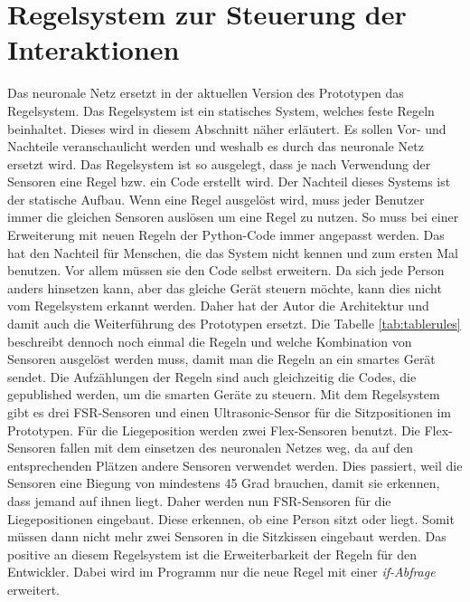 \section{Regelsystem zur Steuerung der Interaktionen} 
\label{sec:rules}
Das neuronale Netz ersetzt in der aktuellen Version des Prototypen das Regelsystem. Das Regelsystem ist ein statisches System, welches feste Regeln beinhaltet. Dieses wird in diesem Abschnitt näher erläutert. Es sollen Vor- und Nachteile veranschaulicht werden und weshalb es durch das neuronale Netz ersetzt wird.
\newline
Das Regelsystem ist so ausgelegt, dass je nach Verwendung der Sensoren eine Regel bzw. ein Code erstellt wird. Der Nachteil dieses Systems ist der statische Aufbau. Wenn eine Regel ausgelöst wird, muss jeder Benutzer immer die gleichen Sensoren auslösen um eine Regel zu nutzen. So muss bei einer Erweiterung mit neuen Regeln der Python-Code immer angepasst werden. Das hat den Nachteil für Menschen, die das System nicht kennen und zum ersten Mal benutzen. Vor allem müssen sie den Code selbst erweitern.
\newline
Da sich jede Person anders hinsetzen kann, aber das gleiche Gerät steuern möchte, kann dies nicht vom Regelsystem erkannt werden. Daher hat der Autor die Architektur und damit auch die Weiterführung des Prototypen ersetzt. Die Tabelle \ref{tab:tablerules} beschreibt dennoch noch einmal die Regeln und welche Kombination von Sensoren ausgelöst werden muss, damit man die Regeln an ein smartes Gerät sendet. Die Aufzählungen der Regeln sind auch gleichzeitig die Codes, die gepublished werden, um die smarten Geräte zu steuern. 
\newline
Mit dem Regelsystem gibt es drei FSR-Sensoren und einen Ultrasonic-Sensor für die Sitzpositionen im Prototypen. Für die Liegeposition werden zwei Flex-Sensoren benutzt. Die Flex-Sensoren fallen mit dem einsetzen des neuronalen Netzes weg, da auf den entsprechenden Plätzen andere Sensoren verwendet werden. Dies passiert, weil die Sensoren eine Biegung von mindestens 45 Grad brauchen, damit sie erkennen, dass jemand auf ihnen liegt. Daher werden nun FSR-Sensoren für die Liegepositionen eingebaut. Diese erkennen, ob eine Person sitzt oder liegt. Somit müssen dann nicht mehr zwei Sensoren in die Sitzkissen eingebaut werden. Das positive an diesem Regelsystem ist die Erweiterbarkeit der Regeln für den Entwickler. Dabei wird im Programm nur die neue Regel mit einer \emph{if-Abfrage} erweitert.

